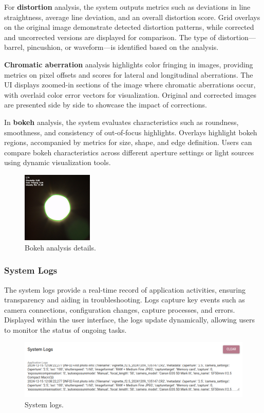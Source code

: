 For \textbf{distortion} analysis, the system outputs metrics such as deviations in line straightness, average line deviation, and an overall distortion score. Grid overlays on the original image demonstrate detected distortion patterns, while corrected and uncorrected versions are displayed for comparison. The type of distortion—barrel, pincushion, or waveform—is identified based on the analysis.

\textbf{Chromatic aberration} analysis highlights color fringing in images, providing metrics on pixel offsets and scores for lateral and longitudinal aberrations. The UI displays zoomed-in sections of the image where chromatic aberrations occur, with overlaid color error vectors for visualization. Original and corrected images are presented side by side to showcase the impact of corrections.

In \textbf{bokeh} analysis, the system evaluates characteristics such as roundness, smoothness, and consistency of out-of-focus highlights. Overlays highlight bokeh regions, accompanied by metrics for size, shape, and edge definition. Users can compare bokeh characteristics across different aperture settings or light sources using dynamic visualization tools.

\begin{figure}[h]
\centering
\includegraphics[width=0.3\textwidth]{Images/bokeh_image_result.jpg}
\caption{Bokeh analysis details.}
\label{fig:ui_bokeh_image}
\end{figure}

\subsubsection{System Logs}
The system logs provide a real-time record of application activities, ensuring transparency and aiding in troubleshooting. Logs capture key events such as camera connections, configuration changes, capture processes, and errors. Displayed within the user interface, the logs update dynamically, allowing users to monitor the status of ongoing tasks.

\begin{figure}[h]
\centering
\includegraphics[width=1\textwidth]{Images/system_logs.png}
\caption{System logs.}
\label{fig:ui_system_logs}
\end{figure}

